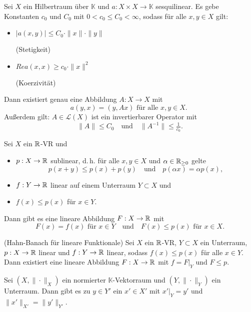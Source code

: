 \documentclass{cheat-sheet}
\newcommand{\K}{\mathbb{K}}
\begin{document}
\begin{satz}
  Sei $X$ ein Hilbertraum über $\K$ und $a : X \times X \to \K$ sesquilinear. Es gebe Konstanten $c_0$ und $C_0$ mit $0 < c_0 \leq C_0 < \infty$, sodass für alle $x, y \in X$ gilt:
  \begin{itemize}
    \item $\left| a(x, y) \right| \leq C_0 \cdot \|x\| \cdot \|y\|$ {\raggedright (Stetigkeit)}
    \item $Re a(x, x) \geq c_0 \cdot \|x\|^2$ {\raggedright (Koerzivität)}
  \end{itemize}
  Dann existiert genau eine Abbildung $A : X \to X$ mit
  \[ a(y, x) = (y, Ax) \text{ für alle $x, y \in X$. } \]
  Außerdem gilt: $A \in \mathcal{L}(X)$ ist ein invertierbarer Operator mit
  \[ \|A\| \leq C_0 \quad \text{und} \quad \|A^{-1}\| \leq \tfrac{1}{c_0}. \]
\end{satz}

\begin{satz}
  Sei $X$ ein $\mathbb{R}$-VR und
  \begin{itemize}
    \item $p : X \to \mathbb{R}$ sublinear, d.\,h. für alle $x, y \in X$ und $\alpha \in \mathbb{R}_{\geq 0}$ gelte
    \[ p(x+y) \leq p(x) + p(y) \quad \text{und} \quad p(\alpha x) = \alpha p(x), \]
    \item $f : Y \to \mathbb{R}$ linear auf einem Unterraum $Y \subset X$ und
    \item $f(x) \leq p(x)$ für $x \in Y$.
  \end{itemize}
  Dann gibt es eine lineare Abbildung $F : X \to \mathbb{R}$ mit
  \[ F(x) = f(x) \text{ für $x \in Y$} \quad \text{und} \quad F(x) \leq p(x) \text{ für } x \in X. \]
\end{satz}

\begin{satz}(Hahn-Banach für lineare Funktionale)
  Sei $X$ ein $\mathbb{R}$-VR, $Y \subset X$ ein Unterraum, $p : X \to \mathbb{R}$ linear und $f : Y \to \mathbb{R}$ linear, sodass $f(x) \leq p(x)$ für alle $x \in Y$. Dann existiert eine lineare Abbildung $F : X \to \mathbb{R}$ mit $f = F|_Y \text{ und } F \leq p$.
\end{satz}

\begin{satz}
  Sei $(X, \|\cdot\|_X)$ ein normierter $\K$-Vektorraum und $(Y, \|\cdot\|_Y)$ ein Unterraum. Dann gibt es zu $y \in Y'$ ein $x' \in X'$ mit $x'|_Y = y'$ und $\|x'\|_{X'} = \|y'\|_{Y'}$.
\end{satz}
\end{document}
